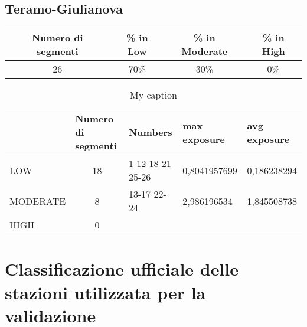 \subsection{Teramo-Giulianova}
\centering
\begin{tabular}  {|c|c|c|c|} 
	
	\hline 
	Numero di segmenti  & \% in Low & \% in Moderate & \% in High \\ 
	\hline 
	26  & 70\% & 30\% & 0\% \\ 
	\hline 
\end{tabular} 
\begin{table}[bh]
	\centering
	\caption{My caption}
	\label{my-label}
	\begin{tabular}{|l|c|l|l|l|}
		\hline
		& \multicolumn{1}{l|}{Numero di segmenti} & Numbers          & max exposure & avg exposure \\ \hline
		LOW      & 18                                      & 1-12 18-21 25-26 & 0,8041957699 & 0,186238294  \\ \hline
		MODERATE & 8                                       & 13-17 22-24      & 2,986196534  & 1,845508738  \\ \hline
		HIGH     & 0                                       &                  &              &              \\ \hline
	\end{tabular}
\end{table}

\section{Classificazione ufficiale delle stazioni utilizzata per la validazione }
\label{risultatiUfficiali}

